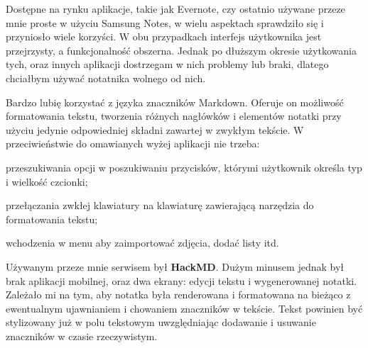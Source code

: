 \documentclass[shortabstract]{iithesis}
\begin{document}
Dostępne na rynku aplikacje, takie jak Evernote, czy ostatnio używane przeze mnie proste w użyciu Samsung Notes, w wielu aspektach sprawdziło się i przyniosło wiele korzyści. W obu przypadkach interfejs użytkownika jest przejrzysty, a funkcjonalność obszerna. Jednak po dłuższym okresie użytkowania tych, oraz innych aplikacji dostrzegam w nich problemy lub braki, dlatego chciałbym używać notatnika wolnego od nich.

Bardzo lubię korzystać z języka znaczników Markdown. Oferuje on możliwość formatowania tekstu, tworzenia różnych nagłówków i elementów notatki przy użyciu jedynie odpowiedniej składni zawartej w zwykłym tekście. W przeciwieństwie do omawianych wyżej aplikacji nie trzeba:
\begin{compactitem}
    \item przeszukiwania opcji w poszukiwaniu przycisków, którymi użytkownik określa typ i wielkość czcionki;
    \item przełączania zwkłej klawiatury na klawiaturę zawierającą narzędzia do formatowania tekstu;
    \item wchodzenia w menu aby zaimportować zdjęcia, dodać listy itd.
\end{compactitem} 
Używanym przeze mnie serwisem był \textbf{HackMD}. Dużym minusem jednak był brak aplikacji mobilnej, oraz dwa ekrany: edycji tekstu i wygenerowanej notatki. Zależało mi na tym, aby notatka była renderowana i formatowana na bieżąco z ewentualnym ujawnianiem i chowaniem znaczników w tekście. Tekst powinien być stylizowany już w polu tekstowym uwzględniając dodawanie i usuwanie znaczników w czasie rzeczywistym.
\end{document}

